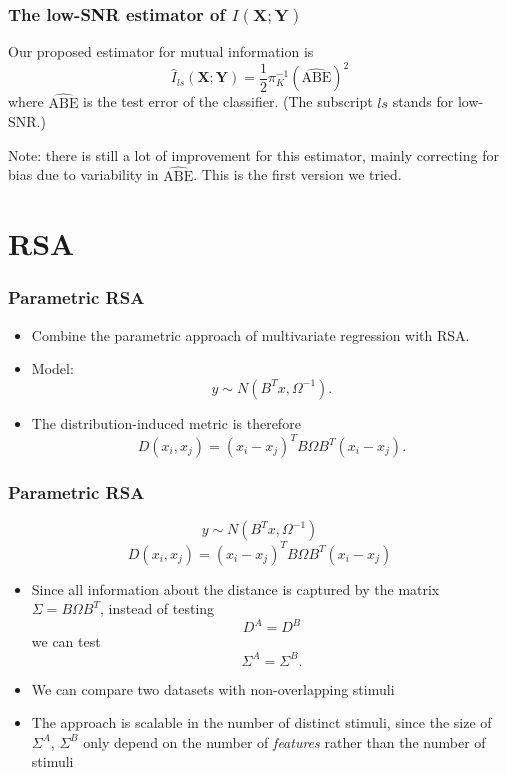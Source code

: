 \documentclass{beamer}
\newcommand{\bX}{\boldsymbol{X}}
\newcommand{\bY}{\boldsymbol{Y}}
\begin{document}
\begin{frame}
\frametitle{The low-SNR estimator of $I(\bX;\bY)$}

Our proposed estimator for mutual information is
\[
\hat{I}_{ls}(\bX; \bY) = \frac{1}{2}\pi_K^{-1}(\widehat{\text{ABE}})^2
\]
where $\widehat{\text{ABE}}$ is the test error of the classifier.
(The subscript $ls$ stands for low-SNR.)

\vspace{0.3in}

Note: there is still a lot of improvement for this estimator,
mainly correcting for bias due to variability in $\widehat{\text{ABE}}$.
This is the first version we tried.

\end{frame}

{


}
\section{RSA}
{





}

\begin{frame}
\frametitle{Parametric RSA}
\begin{itemize}
\item Combine the parametric approach of multivariate regression with RSA.
\item Model:
\[
y \sim N(B^T x, \Omega^{-1}).
\]
\item The distribution-induced metric is therefore
\[
D(x_i, x_j) = (x_i - x_j)^T B \Omega B^T (x_i - x_j).
\]
\end{itemize}
\end{frame}

\begin{frame}
\frametitle{Parametric RSA}
\[
y \sim N(B^T x, \Omega^{-1})
\]
\[
D(x_i, x_j) = (x_i - x_j)^T B \Omega B^T (x_i - x_j)
\]
\begin{itemize}
\item Since all information about the distance is captured by the matrix $\Sigma = B\Omega B^T$, instead of testing
\[
D^A = D^B
\]
we can test
\[
\Sigma^A = \Sigma^B.
\]
\item We can compare two datasets with non-overlapping stimuli
\item The approach is scalable in the number of distinct stimuli,
  since the size of $\Sigma^A$, $\Sigma^B$ only depend on the number of
  \emph{features} rather than the number of stimuli
\end{itemize}
\end{frame}
\end{document}
